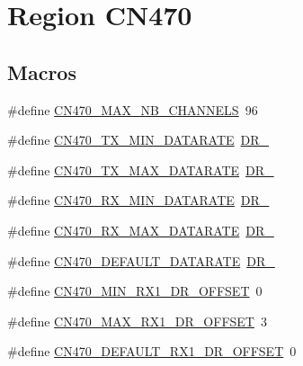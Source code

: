 \hypertarget{group__REGIONCN470}{}\section{Region C\+N470}
\label{group__REGIONCN470}
\subsection*{Macros}
\begin{DoxyCompactItemize}
\item 
\#define \hyperlink{group__REGIONCN470_ga8dd3b552d535062e91b0651705041387}{C\+N470\+\_\+\+M\+A\+X\+\_\+\+N\+B\+\_\+\+C\+H\+A\+N\+N\+E\+LS}~96
\item 
\#define \hyperlink{group__REGIONCN470_gafc089f5bdc4ad69267f562d1fda11f79}{C\+N470\+\_\+\+T\+X\+\_\+\+M\+I\+N\+\_\+\+D\+A\+T\+A\+R\+A\+TE}~\hyperlink{group__REGION_ga6c4ef966b4f3d5eb7597b087f2b97095}{D\+R\+\_}
\item 
\#define \hyperlink{group__REGIONCN470_ga6124e3e1f145254943806b46c8844c1e}{C\+N470\+\_\+\+T\+X\+\_\+\+M\+A\+X\+\_\+\+D\+A\+T\+A\+R\+A\+TE}~\hyperlink{group__REGION_ga872e12c82020c02a7f70a1c6ed1375df}{D\+R\+\_}
\item 
\#define \hyperlink{group__REGIONCN470_ga5aa969a4651406bcd74903035a8cfc4f}{C\+N470\+\_\+\+R\+X\+\_\+\+M\+I\+N\+\_\+\+D\+A\+T\+A\+R\+A\+TE}~\hyperlink{group__REGION_ga6c4ef966b4f3d5eb7597b087f2b97095}{D\+R\+\_}
\item 
\#define \hyperlink{group__REGIONCN470_ga32c6368247a51d46cc53dfe9ea8c1d39}{C\+N470\+\_\+\+R\+X\+\_\+\+M\+A\+X\+\_\+\+D\+A\+T\+A\+R\+A\+TE}~\hyperlink{group__REGION_ga872e12c82020c02a7f70a1c6ed1375df}{D\+R\+\_}
\item 
\#define \hyperlink{group__REGIONCN470_gab5525fe4b5cbe390c85fc1157a27860f}{C\+N470\+\_\+\+D\+E\+F\+A\+U\+L\+T\+\_\+\+D\+A\+T\+A\+R\+A\+TE}~\hyperlink{group__REGION_ga6c4ef966b4f3d5eb7597b087f2b97095}{D\+R\+\_}
\item 
\#define \hyperlink{group__REGIONCN470_gabba9bdb3ecb54ce42aeaf14c3bc639f4}{C\+N470\+\_\+\+M\+I\+N\+\_\+\+R\+X1\+\_\+\+D\+R\+\_\+\+O\+F\+F\+S\+ET}~0
\item 
\#define \hyperlink{group__REGIONCN470_ga2d30070788e36cbb178f0fb025f23a91}{C\+N470\+\_\+\+M\+A\+X\+\_\+\+R\+X1\+\_\+\+D\+R\+\_\+\+O\+F\+F\+S\+ET}~3
\item 
\#define \hyperlink{group__REGIONCN470_gac88e0c39828cba950425f0fbee5d6b59}{C\+N470\+\_\+\+D\+E\+F\+A\+U\+L\+T\+\_\+\+R\+X1\+\_\+\+D\+R\+\_\+\+O\+F\+F\+S\+ET}~0

\end{DoxyCompactItemize}

